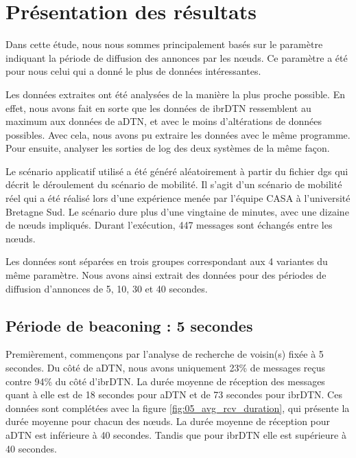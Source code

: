 \documentclass[a4paper,10pt]{article}
\begin{document}
\section {Présentation des résultats}
Dans cette étude, nous nous sommes principalement basés sur le paramètre indiquant la période de diffusion des annonces par les nœuds. Ce paramètre a été pour nous celui qui a donné le plus de données intéressantes. \par

Les données extraites ont été analysées de la manière la plus proche possible. En effet, nous avons fait en sorte que les données de ibrDTN ressemblent au maximum aux données de aDTN, et avec le moins d’altérations de données possibles. Avec cela, nous avons pu extraire les données avec le même programme. Pour ensuite, analyser les sorties de log des deux systèmes de la même façon.\par

Le scénario applicatif utilisé a été généré aléatoirement à partir du fichier dgs qui décrit le déroulement du scénario de mobilité. Il s’agit d’un scénario de mobilité réel qui a été réalisé lors d'une expérience menée par l'équipe CASA à l’université Bretagne Sud. Le scénario dure plus d’une vingtaine de minutes, avec une dizaine de nœuds impliqués. Durant l'exécution, 447 messages sont échangés entre les nœuds. \par

Les données sont séparées en trois groupes correspondant aux 4 variantes du même paramètre. Nous avons ainsi extrait des données pour des périodes de diffusion d'annonces de 5, 10, 30 et 40 secondes.

\subsection {Période de beaconing : 5 secondes}

Premièrement, commençons par l’analyse de recherche de voisin(s) fixée à 5 secondes. Du côté de aDTN, nous avons uniquement 23\% de messages reçus contre 94\% du côté d’ibrDTN. La durée moyenne de réception des messages quant à elle est de 18 secondes pour aDTN et de 73 secondes pour ibrDTN. Ces données sont complétées avec la figure \ref{fig:05_avg_rcv_duration}, qui présente la durée moyenne pour chacun des nœuds. La durée moyenne de réception pour aDTN est inférieure à 40 secondes. Tandis que pour ibrDTN elle est supérieure à 40 secondes. \par
\end{document}
